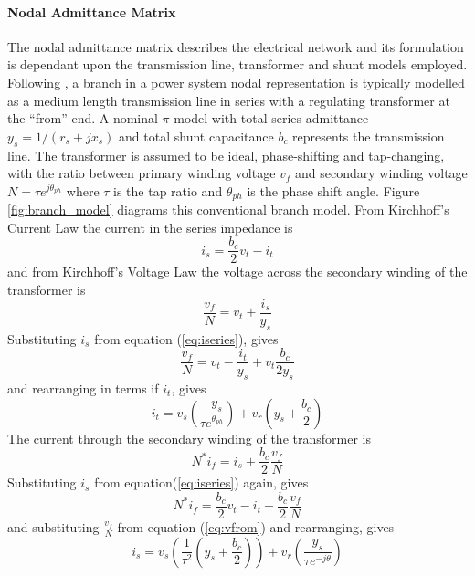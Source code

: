 \paragraph{Nodal Admittance Matrix}
The nodal admittance matrix describes the electrical network and its
formulation is dependant upon the transmission line, transformer and shunt
models employed.  Following , a branch in a power
system nodal representation is typically modelled as a medium length
transmission line in series with a regulating transformer at the ``from'' end.
A nominal-$\pi$ model with total series admittance $y_s = 1/(r_s+jx_s)$ and
total shunt capacitance $b_c$ represents the transmission line.  The
transformer is assumed to be ideal, phase-shifting and tap-changing, with the
ratio between primary winding voltage $v_{f}$ and secondary winding voltage
$N = \tau e^{j\theta_{ph}}$ where $\tau$ is the tap ratio and $\theta_{ph}$ is
the phase shift angle. Figure \ref{fig:branch_model} diagrams this
conventional branch model.  From Kirchhoff's Current Law the current in the
series impedance is
\begin{equation}
\label{eq:iseries}
i_s = \frac{b_c}{2}v_t - i_t
\end{equation}
and from Kirchhoff's Voltage Law the voltage across the secondary winding of
the transformer is
\begin{equation}
\frac{v_{f}}{N} = v_t + \frac{i_s}{y_s}
\end{equation}
Substituting $i_s$ from equation (\ref{eq:iseries}), gives
\begin{equation}
\label{eq:vfrom}
\frac{v_{f}}{N} = v_t - \frac{i_t}{y_s} + v_t\frac{b_c}{2y_s}
\end{equation}
and rearranging in terms if $i_t$, gives
\begin{equation}
\label{eq:ito}
i_t = v_s \left( \frac{-y_s}{\tau e^{\theta_{ph}}} \right) +
v_r \left( y_s + \frac{b_c}{2} \right)
\end{equation}
The current through the secondary winding of the transformer is
\begin{equation}
N^*i_f = i_s + \frac{b_c}{2}\frac{v_{f}}{N}
\end{equation}
Substituting $i_s$ from equation(\ref{eq:iseries}) again, gives
\begin{equation}
N^*i_f = \frac{b_c}{2}v_t - i_t + \frac{b_c}{2}\frac{v_{f}}{N}
\end{equation}
and substituting $\frac{v_{f}}{N}$ from equation (\ref{eq:vfrom}) and
rearranging, gives
\begin{equation}
\label{eq:ifrom}
i_s = v_s \left( \frac{1}{\tau^2} \left(y_s + \frac{b_c}{2}\right) \right) +
v_r \left(\frac{y_s}{\tau e^{-j\theta}}\right)
\end{equation}

